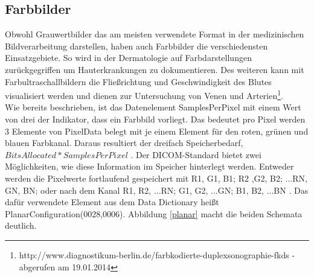 \subsection{Farbbilder} \label{color_images}
Obwohl Grauwertbilder das am meisten verwendete Format in der medizinischen Bildverarbeitung darstellen, haben auch Farbbilder die verschiedensten Einsatzgebiete. So wird in der Dermatologie auf Farbdarstellungen zurückgegriffen um Hauterkrankungen zu dokumentieren\cite[2.2.3.2]{handels:mbv}. Des weiteren kann mit Farbultraschallbildern die Fließrichtung und Geschwindigkeit des Blutes visualisiert werden und dienen zur Untersuchung von Venen und Arterien\footnote{http://www.diagnostikum-berlin.de/farbkodierte-duplexsonographie-fkds - abgerufen am 19.01.2014}.\\
Wie bereits beschrieben, ist das Datenelement SamplesPerPixel mit einem Wert von drei der Indikator, dass ein Farbbild vorliegt. Das bedeutet pro Pixel werden 3 Elemente von PixelData belegt mit je einem Element für den roten, grünen und blauen Farbkanal. Daraus resultiert der dreifach Speicherbedarf, $BitsAllocated * SamplesPerPixel$ \cite[C.7.6.3.1.1]{dicom:iod}. Der DICOM-Standard bietet zwei Möglichkeiten, wie diese Information im Speicher hinterlegt werden. Entweder werden die Pixelwerte fortlaufend gespeichert mit R1, G1, B1; R2 ,G2, B2; ...RN, GN, BN; oder nach dem Kanal R1, R2, ...RN; G1, G2, ...GN; B1, B2, ...BN \cite[C.7.6.3.1.3]{dicom:iod}. Das dafür verwendete Element  aus dem Data Dictionary heißt PlanarConfiguration(0028,0006). Abbildung \ref{planar} macht die beiden Schemata deutlich.

